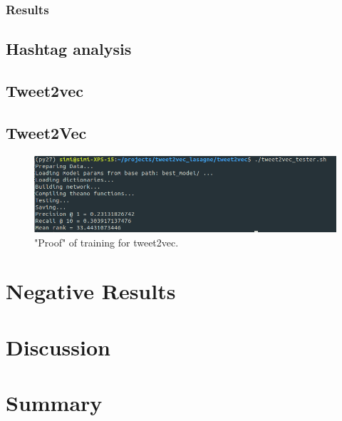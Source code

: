 \documentclass[10pt,conference,compsocconf]{IEEEtran}
\begin{document}
\subsubsection{Results}

 
\subsection{Hashtag analysis}


\subsection{Tweet2vec}


\subsection{Tweet2Vec}
\begin{figure}
	\centering
	\includegraphics[width=0.7\linewidth]{images/tweet2vec_training}
	\caption{"Proof" of training for tweet2vec.}
	\label{fig:tweet2vectraining}
\end{figure}

\section{Negative Results}


\section{Discussion}
\label{sec:Discussion}

\section{Summary}
\label{sec:Summary}





\end{document}
